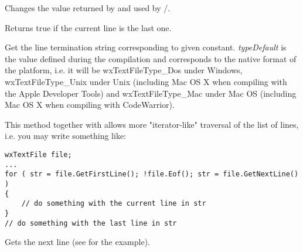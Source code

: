 \label{wxtextfilegotoline}


Changes the value returned by  
and used by /.

\label{wxtextfileeof}


Returns true if the current line is the last one.

\label{wxtextfilegeteol}


Get the line termination string corresponding to given constant. {\it typeDefault} is
the value defined during the compilation and corresponds to the native format
of the platform, i.e. it will be wxTextFileType\_Dos under Windows,
wxTextFileType\_Unix under Unix (including Mac OS X when compiling with the
Apple Developer Tools) and wxTextFileType\_Mac under Mac OS (including
Mac OS X when compiling with CodeWarrior).

\label{wxtextfilegetfirstline}


This method together with  
allows more "iterator-like" traversal of the list of lines, i.e. you may
write something like:

\begin{verbatim}
wxTextFile file;
...
for ( str = file.GetFirstLine(); !file.Eof(); str = file.GetNextLine() )
{
    // do something with the current line in str
}
// do something with the last line in str
\end{verbatim}

\label{wxtextfilegetnextline}


Gets the next line (see  for 
the example).

\label{wxtextfilegetprevline}


